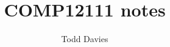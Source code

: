 \newcommand{\Author}{Todd Davies} 
\newcommand{\Title}{COMP12111 notes}

\author{\Author}
\title{\Title}